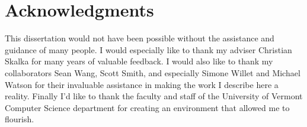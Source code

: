 

\chapter*{Acknowledgments} 

\doublespace

This dissertation would not have been possible without the assistance and guidance of many
people. I would especially like to thank my adviser Christian Skalka for many years of valuable
feedback. I would also like to thank my collaborators Sean Wang, Scott Smith, and especially
Simone Willet and Michael Watson for their invaluable assistance in making the work I describe
here a reality. Finally I'd like to thank the faculty and staff of the University of Vermont
Computer Science department for creating an environment that allowed me to flourish.

\primaryspacing
